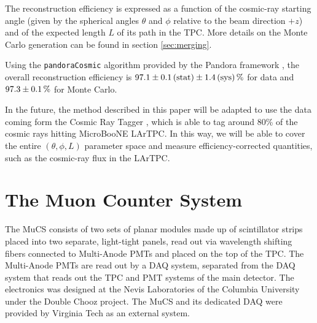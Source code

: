 \documentclass[a4paper]{scrartcl}
\begin{document}
The reconstruction efficiency is expressed as a function of the cosmic-ray starting angle (given by the spherical angles $\theta$ and $\phi$ relative to the beam direction $+z$) and of the expected length $L$ of its path in the TPC. More details on the Monte Carlo generation can be found in section \ref{sec:merging}.%

Using the \texttt{pan\-do\-ra\-Co\-smic} algorithm \cite{pandoracosmic} provided by the Pandora framework \cite{pandora}, the overall reconstruction efficiency is $97.1\pm0.1\thinspace(\mathrm{stat}) \pm 1.4\thinspace(\mathrm{sys})\thinspace\%$ for data and $97.3\pm0.1\thinspace\%$ for Monte Carlo.

In the future, the method described in this paper will be adapted to use the data coming form the Cosmic Ray Tagger \cite{crt}, which is able to tag around 80\% of the cosmic rays hitting MicroBooNE LArTPC. In this way, we will be able to cover the entire $(\theta,\phi,L)$ parameter space and measure efficiency-corrected quantities, such as the cosmic-ray flux in the LArTPC.

\section{The Muon Counter System}\label{sec:proc}
The MuCS consists of two sets of planar modules made up of scintillator strips placed into two separate, light-tight panels, read out via wavelength shifting fibers connected to Multi-Anode PMTs and placed on the top of the TPC. The Multi-Anode PMTs are read out by a DAQ system, separated from the DAQ system that reads out the TPC and PMT systems of the main detector.
The electronics was designed at the Nevis Laboratories of the Columbia University under the Double Chooz project. The MuCS and its dedicated DAQ were provided by Virginia Tech as an external system.
\end{document}
